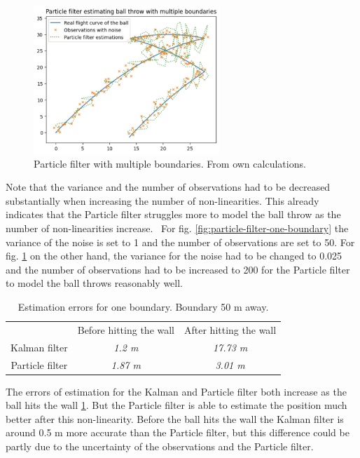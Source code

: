 \documentclass[conference]{IEEEtran}
\begin{document}
\begin{figure}
	\centering
	\includegraphics[width=70mm]{figs/particle-filter-multiple-boundaries}
	\caption{Particle filter with multiple boundaries. From own calculations.}
	\label{fig:particle-filter-multiple-boundaries}
\end{figure}
Note that the variance and the number of observations had to be decreased substantially when increasing the number of non-linearities. 
This already indicates that the Particle filter struggles more to model the ball throw as the number of non-linearities increase. 
For fig. \ref{fig:particle-filter-one-boundary} the variance of the noise is set to 1 and the number of observations are set to 50.
For fig. \ref{fig:particle-filter-multiple-boundaries} on the other hand, the variance for the noise had to be changed to 0.025 and the number of observations had to be increased to 200 for the Particle filter to model the ball throws reasonably well. \\

\begin{table}[htbp]
    \caption{Estimation errors for one boundary. Boundary 50 m away.}
    \begin{center}
    \begin{tabular}{|c|c|c|}
    \cline{1-3}
    & Before hitting the wall & After hitting the wall \\
    \cline{1-3} 
    Kalman filter & \textit{1.2 m} & \textit{17.73 m} \\
    \cline{1-3} 
    Particle filter & \textit{1.87 m} & \textit{3.01 m} \\
    \hline
    \end{tabular}
    \label{tab:comparing-kalman-particle}
    \end{center}
\end{table}
The errors of estimation for the Kalman and Particle filter both increase as the ball hits the wall \ref{tab:comparing-kalman-particle}.
But the Particle filter is able to estimate the position much better after this non-linearity.
Before the ball hits the wall the Kalman filter is around 0.5 m more accurate than the Particle filter, but this difference could be partly due to the uncertainty of the observations and the Particle filter.
\end{document}
